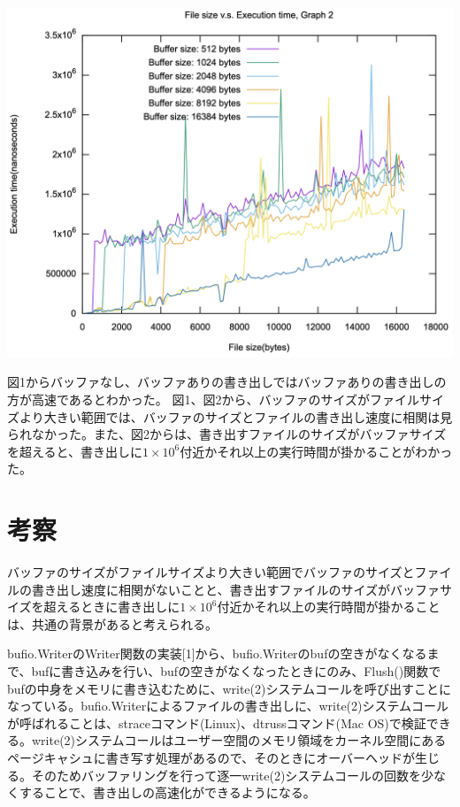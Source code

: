 \documentclass[
  12pt,
  a4j]{ltjarticle}
\let\origfigure\figure
\let\endorigfigure\endfigure
\renewenvironment{figure}[1][2] {
    \expandafter\origfigure\expandafter[H]
} {
    \endorigfigure
}
\begin{document}
\begin{figure}
\centering
\includegraphics{../png/graph2.png}
\caption{16384 bytes以内の範囲のバッファの書き出しの速度のグラフ}
\end{figure}

図1からバッファなし、バッファありの書き出しではバッファありの書き出しの方が高速であるとわかった。
図1、図2から、バッファのサイズがファイルサイズより大きい範囲では、バッファのサイズとファイルの書き出し速度に相関は見られなかった。また、図2からは、書き出すファイルのサイズがバッファサイズを超えると、書き出しに\(1\times 10^{6}\)付近かそれ以上の実行時間が掛かることがわかった。

\hypertarget{ux8003ux5bdf}{%
\section{考察}\label{ux8003ux5bdf}}

バッファのサイズがファイルサイズより大きい範囲でバッファのサイズとファイルの書き出し速度に相関がないことと、書き出すファイルのサイズがバッファサイズを超えるときに書き出しに\(1\times 10^{6}\)付近かそれ以上の実行時間が掛かることは、共通の背景があると考えられる。

bufio.WriterのWriter関数の実装{[}1{]}から、bufio.Writerのbufの空きがなくなるまで、bufに書き込みを行い、bufの空きがなくなったときにのみ、Flush()関数でbufの中身をメモリに書き込むために、write(2)システムコールを呼び出すことになっている。bufio.Writerによるファイルの書き出しに、write(2)システムコールが呼ばれることは、straceコマンド(Linux)、dtrussコマンド(Mac
OS)で検証できる。write(2)システムコールはユーザー空間のメモリ領域をカーネル空間にあるページキャシュに書き写す処理があるので、そのときにオーバーヘッドが生じる。そのためバッファリングを行って逐一write(2)システムコールの回数を少なくすることで、書き出しの高速化ができるようになる。
\end{document}
